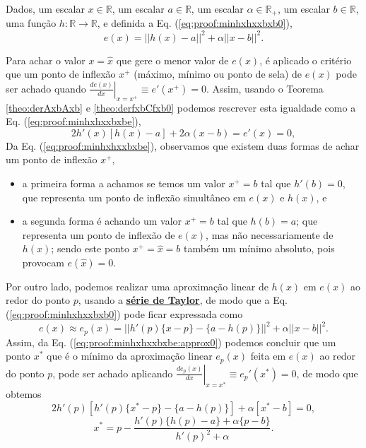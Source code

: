 \begin{myproofT}\label{proof:theo:minhxhxxbxb}

Dados,
um escalar $x \in \mathbb{R}$, 
um escalar $a \in \mathbb{R}$,
um escalar $\alpha \in \mathbb{R}_{+}$,
um escalar $b \in \mathbb{R}$,
uma função $h:\mathbb{R} \rightarrow \mathbb{R}$, e 
definida a Eq. (\ref{eq:proof:minhxhxxbxb0}),
\begin{equation}\label{eq:proof:minhxhxxbxb0}
e(x)=||h(x)-a||^2+\alpha ||x-b||^2.
\end{equation}

Para achar o valor  $x=\hat{x}$ que gere o menor valor de $e(x)$, é aplicado
o critério que um ponto de inflexão $x^+$ (máximo, mínimo ou ponto de sela) de $e(x)$ 
pode ser achado quando 
$\left. \frac{d e(x)}{d x }\right|_{x=x^+} \equiv e'(x^+) =0$.
Assim, 
usando o Teorema \ref{theo:derAxbAxb} e \ref{theo:derfxbCfxb0} podemos 
rescrever esta igualdade como a Eq. (\ref{eq:proof:minhxhxxbxbe}),
\begin{equation}\label{eq:proof:minhxhxxbxbe}
2  h'(x) \left[h(x) -a\right]+2\alpha (x-b)= e'(x)=0,
\end{equation}
Da Eq. (\ref{eq:proof:minhxhxxbxbe}), observamos 
que existem duas formas de achar um ponto de inflexão $x^+$,
\begin{itemize}
 \item a primeira forma a achamos se temos um valor $x^+=b$ tal que $h'(b)=0$, 
que representa um ponto de inflexão simultâneo em $e(x)$ e $h(x)$, e
 \item a segunda forma é achando um valor $x^+=b$ tal que $h(b)=a$;
que representa um ponto de inflexão de $e(x)$, mas não
necessariamente de $h(x)$; 
sendo este ponto $x^+=\hat{x}=b$ também um mínimo absoluto, pois provocam $e(\hat{x})=0$.
\end{itemize}

Por outro lado, podemos realizar uma aproximação linear de $h(x)$ em $e(x)$
ao redor do ponto $p$, usando a \hyperref[def:taylor]{\textbf{série de Taylor}},
de modo que a Eq. (\ref{eq:proof:minhxhxxbxb0}) pode ficar expressada como
\begin{equation}\label{eq:proof:minhxhxxbxbe:approx0}
e(x) \approx  e_p(x) = ||h'(p)\{x-p\}-\{a-h(p)\}||^2+\alpha ||x-b||^2.
\end{equation}
Assim, da Eq. (\ref{eq:proof:minhxhxxbxbe:approx0})
podemos concluir que um ponto $x^*$ que é 
o mínimo da aproximação linear $e_p(x)$ feita em $e(x)$ ao redor do ponto $p$,
pode ser achado aplicando $\left. \frac{d e_p(x)}{d x }\right|_{x=x^*} \equiv e_{p}'(x^*) =0$,
de modo que obtemos
\begin{equation}\label{eq:proof:minhxhxaxb2a}
 2 h'(p)[h'(p)\{x^*-p\} -\{a-h(p)\}] + \alpha [x^*-b] = 0,
\end{equation} 
\begin{equation}\label{eq:proof:minhxhxaxb2}
x^* = p - \frac{h'(p)\{h(p)-a\}+\alpha\{p-b\}}{ h'(p)^2+\alpha}.
\end{equation} 


\end{myproofT}
